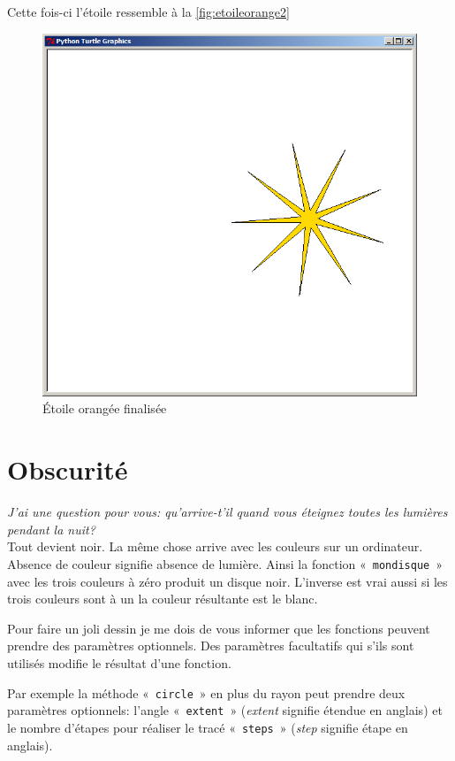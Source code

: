 Cette fois-ci l'étoile ressemble à la \autoref{fig:etoileorange2}
\begin{figure}[h!]
\centering
\includegraphics[scale=0.4]{images/etoileorange2}
\caption{Étoile orangée finalisée}\label{fig:etoileorange2}
\end{figure}

\section{Obscurité}

\emph{J'ai une question pour vous: qu'arrive-t'il quand vous éteignez toutes les lumières pendant la nuit?}\\

Tout devient noir. La même chose arrive avec les couleurs sur un ordinateur. Absence de couleur signifie absence de lumière. Ainsi la fonction «~\texttt{mondisque}~» avec les trois couleurs à zéro produit un disque noir. L'inverse est vrai aussi si les trois couleurs sont à un la couleur résultante est le blanc.

Pour faire un joli dessin je me dois de vous informer que les fonctions peuvent prendre des paramètres optionnels. Des paramètres facultatifs qui s'ils sont utilisés modifie le résultat d'une fonction.

Par exemple la méthode «~\texttt{circle}~» en plus du rayon peut prendre deux paramètres optionnels: l'angle «~\texttt{extent}~» (\emph{extent} signifie étendue en anglais) et le nombre d'étapes pour réaliser le tracé «~\texttt{steps}~»   (\emph{step} signifie étape en anglais).

